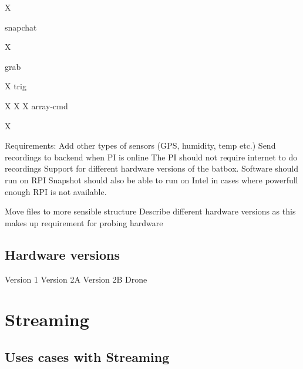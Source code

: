X


snapchat


X




grab






X
trig


X
X
X
array-cmd




X




Requirements:
Add other types of sensors (GPS, humidity, temp etc.)
Send recordings to backend when PI is online
The PI should not require internet to do recordings
Support for different hardware versions of the batbox.
Software should run on RPI
Snapshot should also be able to run on Intel in cases where powerfull enough RPI is not available.




Move files to more sensible structure
Describe different hardware versions as this makes up requirement for probing hardware

\subsection{Hardware versions}
Version 1
Version 2A
Version 2B
Drone

\section{Streaming}

\subsection{Uses cases with Streaming}


